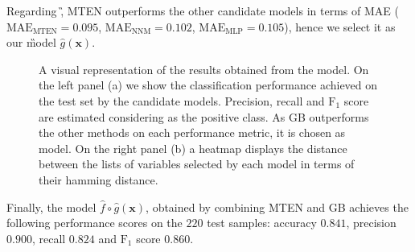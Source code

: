 Regarding \G, MTEN outperforms the other candidate models in terms of MAE ( $\text{MAE}_{\text{MTEN}}=0.095$, $\text{MAE}_{\text{NNM}}=0.102$, $\text{MAE}_{\text{MLP}}=0.105$), hence we select it as our \G model $\hat{g}(\bm{x})$.


 \begin{figure}[h!]
	\centering
	 \hfill%
	\caption{A visual representation of the results obtained from the \F model. On the left panel (a) we show the classification performance achieved on the test set by the candidate models. Precision, recall and $\text{F}_1$ score are estimated considering \SP as the positive class. As GB outperforms the other methods on each performance metric, it is chosen as \F model. On the right panel (b) a heatmap displays the distance between the lists of variables selected by each model in terms of their hamming distance. }\label{fig:f}
\end{figure}


%
Finally, the \FOG model $\hat{f} \circ \hat{g}(\bm{x})$, obtained by combining MTEN and GB achieves the following performance scores on the $220$ test samples: accuracy $0.841$, precision $0.900$, recall $0.824$ and $\text{F}_1$ score $0.860$.


